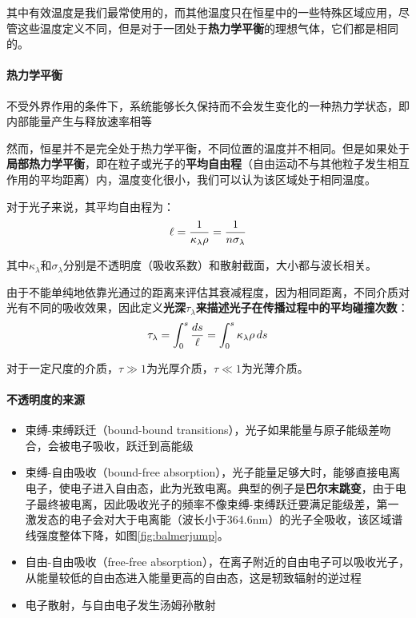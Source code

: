 其中有效温度是我们最常使用的，而其他温度只在恒星中的一些特殊区域应用，尽管这些温度定义不同，但是对于一团处于\textbf{热力学平衡}的理想气体，它们都是相同的。

\paragraph{热力学平衡}
不受外界作用的条件下，系统能够长久保持而不会发生变化的一种热力学状态，即内部能量产生与释放速率相等


然而，恒星并不是完全处于热力学平衡，不同位置的温度并不相同。但是如果处于\textbf{局部热力学平衡}，即在粒子或光子的\textbf{平均自由程}（自由运动不与其他粒子发生相互作用的平均距离）内，温度变化很小，我们可以认为该区域处于相同温度。

对于光子来说，其平均自由程为：
\begin{equation}
  \ell={1\over \kappa_\lambda \rho}={1\over n \sigma_\lambda}
\end{equation}

其中$\kappa_\lambda$和$\sigma_\lambda$分别是不透明度（吸收系数）和散射截面，大小都与波长相关。

由于不能单纯地依靠光通过的距离来评估其衰减程度，因为相同距离，不同介质对光有不同的吸收效果，因此定义\textbf{光深$\tau_\lambda$来描述光子在传播过程中的平均碰撞次数}：
\begin{equation}
  \tau_\lambda=\int^s_0{ds\over \ell}=\int_0^s\kappa_\lambda\rho\,ds
\end{equation}

对于一定尺度的介质，$\tau\gg1$为光厚介质，$\tau\ll1$为光薄介质。

\paragraph{不透明度的来源}
\begin{itemize}
  \item 束缚-束缚跃迁（bound-bound transitions），光子如果能量与原子能级差吻合，会被电子吸收，跃迁到高能级
  \item 束缚-自由吸收（bound-free absorption），光子能量足够大时，能够直接电离电子，使电子进入自由态，此为光致电离。典型的例子是\textbf{巴尔末跳变}，由于电子最终被电离，因此吸收光子的频率不像束缚-束缚跃迁要满足能级差，第一激发态的电子会对大于电离能（波长小于364.6\;nm）的光子全吸收，该区域谱线强度整体下降，如图\ref{fig:balmerjump}。
  \item 自由-自由吸收（free-free absorption），在离子附近的自由电子可以吸收光子，从能量较低的自由态进入能量更高的自由态，这是轫致辐射的逆过程
  \item 电子散射，与自由电子发生汤姆孙散射
\end{itemize}

